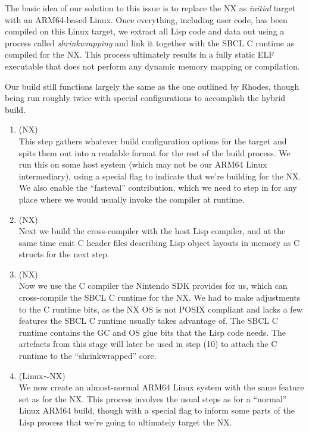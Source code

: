 \documentclass[format=sigconf]{acmart}
\begin{document}
The basic idea of our solution to this issue is to replace the NX as \textit{initial} target with an ARM64-based Linux. Once everything, including user code, has been compiled on this Linux target, we extract all Lisp code and data out using a process called \textit{shrinkwrapping} and link it together with the SBCL C runtime as compiled for the NX. This process ultimately results in a fully static ELF executable that does not perform any dynamic memory mapping or compilation.

Our build still functions largely the same as the one outlined by Rhodes\cite{rhodes2008sbcl}, though being run roughly twice with special configurations to accomplish the hybrid build.

\begin{enumerate}
\item {} (NX) \\
  This step gathers whatever build configuration options for the target and spits them out into a readable format for the rest of the build process. We run this on some host system (which may not be our ARM64 Linux intermediary), using a special flag to indicate that we're building for the NX. We also enable the ``fasteval'' contribution, which we need to step in for any place where we would usually invoke the compiler at runtime.
\item {} (NX) \\
  Next we build the cross-compiler with the host Lisp compiler, and at the same time emit C header files describing Lisp object layouts in memory as C structs for the next step.
\item {} (NX) \\
  Now we use the C compiler the Nintendo SDK provides for us, which can cross-compile the SBCL C runtime for the NX. We had to make adjustments to the C runtime bits, as the NX OS is not POSIX compliant and lacks a few features the SBCL C runtime usually takes advantage of. The SBCL C runtime contains the GC and OS glue bits that the Lisp code needs. The artefacts from this stage will later be used in step (10) to attach the C runtime to the ``shrinkwrapped'' core.
\item {} (Linux$\sim$NX) \\
  We now create an almost-normal ARM64 Linux system with the same feature set as for the NX. This process involves the usual steps as for a ``normal'' Linux ARM64 build, though with a special flag to inform some parts of the Lisp process that we're going to ultimately target the NX.

\end{enumerate}
\end{document}
